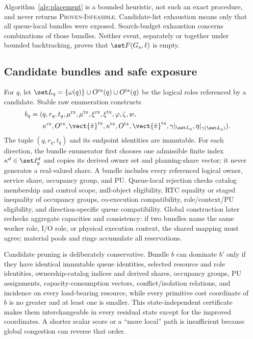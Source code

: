 Algorithm~\ref{alg:placement} is a bounded heuristic, not such an exact procedure, and never returns \textsc{Proven-Infeasible}. Candidate-list exhaustion means only that all queue-local bundles were exposed. Search-budget exhaustion concerns combinations of those bundles. Neither event, separately or together under bounded backtracking, proves that $\set F(G_s,\ell)$ is empty.

\subsection{Candidate bundles and safe exposure}

For $q$, let $\set L_q=\{\omega(q)\}\cup O^{\mathrm{rx}}(q)\cup O^{\mathrm{tx}}(q)$ be the logical roles referenced by a candidate. Stable raw enumeration constructs
\begin{align}
 b_q=(&q,r_q,t_q,\mu^{\mathrm{rx}},\mu^{\mathrm{tx}},
 \xi^{\mathrm{rx}},\xi^{\mathrm{tx}},\varphi,\zeta,w,\notag\\
 &\kappa^{\mathrm{rx}},O^{\mathrm{rx}},\vect{\bar\pi}^{\mathrm{rx}},
 \kappa^{\mathrm{tx}},O^{\mathrm{tx}},\vect{\bar\pi}^{\mathrm{tx}},
 \gamma|_{\set L_q},\eta|_{\gamma(\set L_q)}).
 \label{eq:candidate-bundle}
\end{align}
The tuple $(q,r_q,t_q)$ and its endpoint identities are immutable. For each direction, the bundle enumerator first chooses one admissible finite index $\kappa^d\in\set I_q^d$ and copies its derived owner set and planning-share vector; it never generates a real-valued share. A bundle includes every referenced logical owner, service share, occupancy group, and PU. Queue-local rejection checks catalog membership and control scope, null-object eligibility, RTC equality or staged inequality of occupancy groups, co-execution compatibility, role/context/PU eligibility, and direction-specific queue compatibility. Global construction later rechecks aggregate capacities and consistency: if two bundles name the same worker role, I/O role, or physical execution context, the shared mapping must agree; material pools and rings accumulate all reservations.

Candidate pruning is deliberately conservative. Bundle $b$ can dominate $b'$ only if they have identical immutable queue identities, selected resource and role identities, ownership-catalog indices and derived shares, occupancy groups, PU assignments, capacity-consumption vectors, conflict/isolation relations, and incidence on every load-bearing resource, while every primitive cost coordinate of $b$ is no greater and at least one is smaller. This state-independent certificate makes them interchangeable in every residual state except for the improved coordinates. A shorter scalar score or a “more local” path is insufficient because global congestion can reverse that order.

